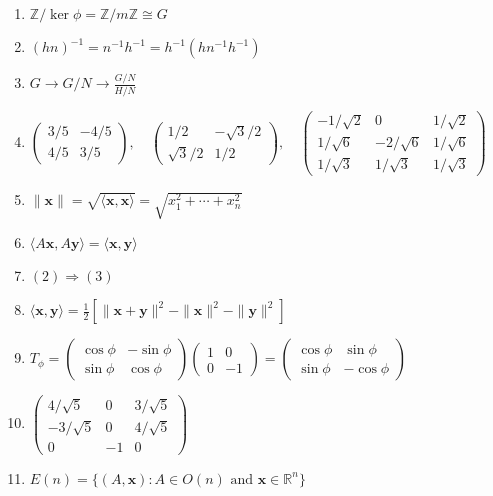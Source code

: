 \documentclass[oneside,10pt,]{article}
\begin{document}
\begin{enumerate}
\item{}\({\mathbb Z} / \ker \phi = {\mathbb Z} / m {\mathbb Z} \cong G\)%
\item{}\(( hn )^{-1} = n^{-1 } h^{-1} = h^{-1} (h n^{-1} h^{-1} )\)%
\item{}\(G \rightarrow G/N \rightarrow \frac{G/N}{H/N} \)%
\item{}\(\begin{pmatrix} 3/5 & -4/5 \\ 4/5 & 3/5 \end{pmatrix}, \quad \begin{pmatrix} 1/2 & -\sqrt{3}/2 \\ \sqrt{3}/2 & 1/2 \end{pmatrix}, \quad \begin{pmatrix} -1/\sqrt{2} & 0 & 1/ \sqrt{2} \\ 1/\sqrt{6} & -2/\sqrt{6} & 1/\sqrt{6} \\ 1/ \sqrt{3} & 1/ \sqrt{3} & 1/ \sqrt{3} \end{pmatrix}\)%
\item{}\(\| {\mathbf x} \| = \sqrt{\langle {\mathbf x}, {\mathbf x} \rangle} = \sqrt{x_1^2 + \cdots + x_n^2}\)%
\item{}\(\langle A{\mathbf x}, A{\mathbf y} \rangle = \langle {\mathbf x},{\mathbf y} \rangle\)%
\item{}\((2) \Rightarrow (3)\)%
\item{}\(\langle {\mathbf x}, {\mathbf y} \rangle = \frac{1}{2} \left[ \|{\mathbf x} +{\mathbf y}\|^2 - \|{\mathbf x}\|^2 - \|{\mathbf y}\|^2 \right]\)%
\item{}\(T_{\phi} = \begin{pmatrix} \cos \phi & - \sin \phi \\ \sin \phi & \cos \phi \end{pmatrix} \begin{pmatrix} 1 & 0 \\ 0 & -1 \end{pmatrix} = \begin{pmatrix} \cos \phi & \sin \phi \\ \sin \phi & - \cos \phi \end{pmatrix}\)%
\item{}\(\begin{pmatrix} 4/ \sqrt{5} & 0 & 3 / \sqrt{5} \\ -3 / \sqrt{5} & 0 & 4 / \sqrt{5} \\ 0 & -1 & 0 \end{pmatrix}\)%
\item{}\(E(n) = \{(A, {\mathbf x}) : A \in O(n) \text{ and } {\mathbf x} \in {\mathbb R}^n \}\)%

\end{enumerate}
\end{document}
